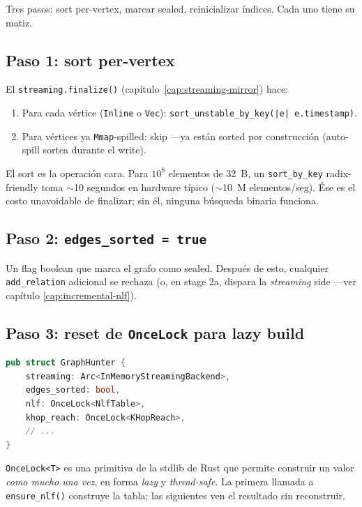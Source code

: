 \noindent
Tres pasos: sort per-vertex, marcar sealed, reinicializar índices.
Cada uno tiene su matiz.

\subsection{Paso 1: sort per-vertex}

El \texttt{streaming.finalize()} (capítulo~\ref{cap:streaming-mirror})
hace:

\begin{enumerate}
    \item Para cada vértice (\texttt{Inline} o \texttt{Vec}):
    \texttt{sort\_unstable\_by\_key(|e| e.timestamp)}.
    \item Para vértices ya \texttt{Mmap}-spilled: skip ---ya están
    sorted por construcción (auto-spill sortea durante el write).
\end{enumerate}

\noindent
El sort es la operación cara. Para $10^8$ elementos de 32~B, un
\texttt{sort\_by\_key} radix-friendly toma $\sim$10 segundos en
hardware típico ($\sim$10~M elementos/seg). Ése es el costo
unavoidable de finalizar; sin él, ninguna búsqueda binaria
funciona.

\subsection{Paso 2: \texttt{edges\_sorted = true}}

Un flag boolean que marca el grafo como sealed. Después de esto,
cualquier \texttt{add\_relation} adicional se rechaza (o, en stage
2a, dispara la \emph{streaming} side ---ver capítulo
\ref{cap:incremental-nlf}).

\subsection{Paso 3: reset de \texttt{OnceLock} para lazy build}

\begin{lstlisting}[language=Rust]
pub struct GraphHunter {
    streaming: Arc<InMemoryStreamingBackend>,
    edges_sorted: bool,
    nlf: OnceLock<NlfTable>,
    khop_reach: OnceLock<KHopReach>,
    // ...
}
\end{lstlisting}

\noindent
\texttt{OnceLock<T>} es una primitiva de la stdlib de Rust que
permite construir un valor \emph{como mucho una vez}, en forma
\emph{lazy} y \emph{thread-safe}. La primera llamada a
\texttt{ensure\_nlf()} construye la tabla; las siguientes ven el
resultado sin reconstruir.

